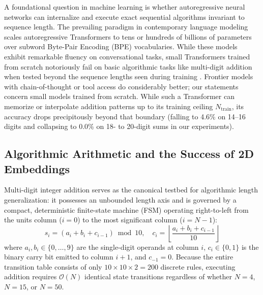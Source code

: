\documentclass[10pt,twocolumn]{article}
\begin{document}
A foundational question in machine learning is whether autoregressive neural networks can internalize and execute exact sequential algorithms invariant to sequence length. The prevailing paradigm in contemporary language modeling scales autoregressive Transformers \cite{vaswani2017attention,brown2020language} to tens or hundreds of billions of parameters over subword Byte-Pair Encoding (BPE) vocabularies. While these models exhibit remarkable fluency on conversational tasks, small Transformers trained from scratch notoriously fail on basic algorithmic tasks like multi-digit addition when tested beyond the sequence lengths seen during training \cite{nogueira2021investigating,shen2023positional,jelassi2023length,dziri2023faith,mcleish2024transformers,kazemnejad2023impact}. Frontier models with chain-of-thought or tool access do considerably better; our statements concern small models trained from scratch. While such a Transformer can memorize or interpolate addition patterns up to its training ceiling $N_{\text{train}}$, its accuracy drops precipitously beyond that boundary (falling to 4.6\% on 14--16 digits and collapsing to 0.0\% on 18- to 20-digit sums in our experiments).

\subsection{Algorithmic Arithmetic and the Success of 2D Embeddings}
\label{sec:algorithmic_math}

Multi-digit integer addition serves as the canonical testbed for algorithmic length generalization: it possesses an unbounded length axis and is governed by a compact, deterministic finite-state machine (FSM) operating right-to-left from the units column ($i = 0$) to the most significant column ($i = N - 1$):
\begin{equation}
s_i = (a_i + b_i + c_{i-1}) \bmod 10, \quad c_i = \left\lfloor \frac{a_i + b_i + c_{i-1}}{10} \right\rfloor
\label{eq:carry_fsm}
\end{equation}
where $a_i, b_i \in \{0, \dots, 9\}$ are the single-digit operands at column $i$, $c_i \in \{0, 1\}$ is the binary carry bit emitted to column $i+1$, and $c_{-1} = 0$. Because the entire transition table consists of only $10 \times 10 \times 2 = 200$ discrete rules, executing addition requires $\mathcal{O}(N)$ identical state transitions regardless of whether $N=4$, $N=15$, or $N=50$.
\end{document}
